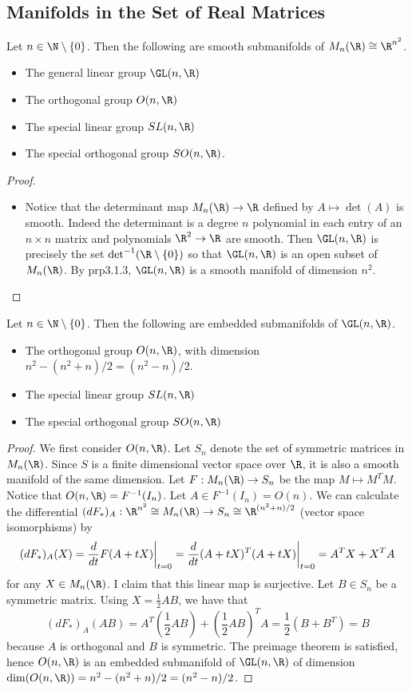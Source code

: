 \documentclass[a4paper]{article}
\begin{document}
\subsection{Manifolds in the Set of Real Matrices}
\begin{prp}{}{} Let $n\in\N\setminus\{0\}$. Then the following are smooth submanifolds of $M_n(\R)\cong\R^{n^2}$. 
\begin{itemize}
\item The general linear group $\GL(n,\R)$
\item The orthogonal group $O(n,\R)$
\item The special linear group $SL(n,\R)$
\item The special orthogonal group $SO(n,\R)$. 
\end{itemize} \tcbline
\begin{proof}~\\
\begin{itemize}
\item Notice that the determinant map $M_n(\R)\to\R$ defined by $A\mapsto\det(A)$ is smooth. Indeed the determinant is a degree $n$ polynomial in each entry of an $n\times n$ matrix and polynomials $\R^2\to\R$ are smooth. Then $\GL(n,\R)$ is precisely the set $\det^{-1}(\R\setminus\{0\})$ so that $\GL(n,\R)$ is an open subset of $M_n(\R)$. By prp3.1.3, $\GL(n,\R)$ is a smooth manifold of dimension $n^2$. 
\end{itemize}
\end{proof}
\end{prp}

\begin{prp}{}{} Let $n\in\N\setminus\{0\}$. Then the following are embedded submanifolds of $\GL(n,\R)$. 
\begin{itemize}
\item The orthogonal group $O(n,\R)$, with dimension $n^2-(n^2+n)/2=(n^2-n)/2$. 
\item The special linear group $SL(n,\R)$
\item The special orthogonal group $SO(n,\R)$
\end{itemize} \tcbline
\begin{proof}
We first consider $O(n,\R)$. Let $S_n$ denote the set of symmetric matrices in $M_n(\R)$. Since $S$ is a finite dimensional vector space over $\R$, it is also a smooth manifold of the same dimension. Let $F:M_n(\R)\to S_n$ be the map $M\mapsto M^TM$. Notice that $O(n,\R)=F^{-1}(I_n)$. Let $A\in F^{-1}(I_n)=O(n)$. We can calculate the differential $(dF_\ast)_A:\R^{n^2}\cong M_n(\R)\to S_n\cong\R^{(n^2+n)/2}$ (vector space isomorphisms) by $$(dF_\ast)_A(X)=\frac{d}{dt}F(A+tX)\bigg{|}_{t=0}=\frac{d}{dt}(A+tX)^T(A+tX)\bigg{|}_{t=0}=A^TX+X^TA$$ for any $X\in M_n(\R)$. I claim that this linear map is surjective. Let $B\in S_n$ be a symmetric matrix. Using $X=\frac{1}{2}AB$, we have that $$(dF_\ast)_A(AB)=A^T(\frac{1}{2}AB)+(\frac{1}{2}AB)^TA=\frac{1}{2}(B+B^T)=B$$ because $A$ is orthogonal and $B$ is symmetric. The preimage theorem is satisfied, hence $O(n,\R)$ is an embedded submanifold of $\GL(n,\R)$ of dimension $\dim(O(n,\R))=n^2-(n^2+n)/2=(n^2-n)/2$. 
\end{proof}
\end{prp}
\end{document}
